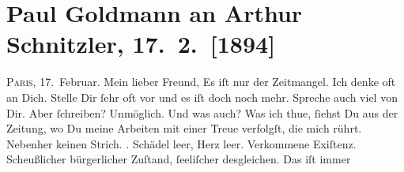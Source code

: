 

         
         \renewcommand{\erwaehntePersonen}{Personen: Henri Albert, Richard Beer-Hofmann, Emil Dürer, Hugo von Hofmannsthal, August Niemann}
         \renewcommand{\erwaehnteInstitutionen}{Institutionen: Freie Bühne}
         \renewcommand{\erwaehnteOrte}{Orte: Paris, Wien}
         \renewcommand{\erwaehnteWerke}{Werke: Der Junggesell. Humoreske, Frankfurter Zeitung, L'Idée libre. Revue mensuelle de Littérature et d'Art, La Société Nouvelle. Revue internationale. Sociologie, Arts, Sciences, Lettres, Le nouvel almanach de M. Bierbaum, Mercure de France, Moderner Musen-Almanach auf das Jahr 1894. Ein Jahrbuch deutscher Kunst, Weihnachts-Einkäufe}
               \section[Paul Goldmann an Arthur Schnitzler, 17. 2. {[}1894{]}]{ Paul Goldmann an Arthur Schnitzler, 17. 2. {[}1894{]}}\nopagebreak{}\rehead{ }\begin{ledgroupsized}[t]{13cm}\normalsize\beginnumbering \toendnotes[C]{\smallbreak\pagebreak[2]} 
\toendnotes[C]{\smallbreak}\pstart
           \raggedleft{}{\pb}\textsc{Paris}, 17. Februar.\pend
           \pstart\center{}Mein lieber Freund,\pend\pstart
           Es iſt nur der Zeitmangel. Ich denke oft an Dich. Stelle Dir ſehr oft vor und es iſt
               doch noch mehr. Spreche auch viel von Dir. Aber ſchreiben? Unmöglich. Und was auch?
               Was ich thue, ſiehst Du aus der Zeitung, wo Du meine Arbeiten mit einer Treue verfolgſt, die mich rührt.
               Nebenher keinen Strich. \textsc{\label{K_L02609-1v}\label{K_L02609-1h}}. Schädel leer, Herz leer. Verkommene Exiſtenz. Scheußlicher bürgerlicher
               Zuſtand, ſeeliſcher desgleichen. {\pb}Das iſt immer

\end{ledgroupsized}
